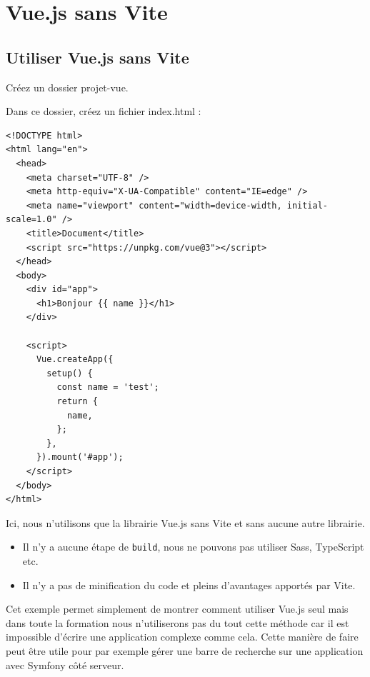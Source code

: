 \documentclass{article}
\begin{document}


\section{Vue.js sans Vite}
\subsection{Utiliser {\color{monOrange}Vue.js} sans {\color{monOrange}Vite}}
Créez un dossier projet-vue.

Dans ce dossier, créez un fichier index.html :
\begin{verbatim}
<!DOCTYPE html>
<html lang="en">
  <head>
    <meta charset="UTF-8" />
    <meta http-equiv="X-UA-Compatible" content="IE=edge" />
    <meta name="viewport" content="width=device-width, initial-scale=1.0" />
    <title>Document</title>
    <script src="https://unpkg.com/vue@3"></script>
  </head>
  <body>
    <div id="app">
      <h1>Bonjour {{ name }}</h1>
    </div>

    <script>
      Vue.createApp({
        setup() {
          const name = 'test';
          return {
            name,
          };
        },
      }).mount('#app');
    </script>
  </body>
</html>
\end{verbatim} 

Ici, nous n'utilisons que la librairie {\color{monOrange}Vue.js} sans {\color{monOrange}Vite} et sans aucune autre librairie. 
\begin{itemize}
\item Il n'y a aucune étape de {\tt build}, nous ne pouvons pas utiliser Sass, TypeScript etc.

\item Il n'y a pas de minification du code et pleins d'avantages apportés par {\color{monOrange}Vite}.
\end{itemize}
Cet exemple permet simplement de montrer comment utiliser {\color{monOrange}Vue.js} seul mais dans toute la formation nous n'utiliserons pas du tout cette méthode car il est impossible d'écrire une application complexe comme cela. Cette manière de faire peut être utile pour par exemple gérer une barre de recherche sur une application avec {\color{monOrange}Symfony} côté serveur.
\end{document}
